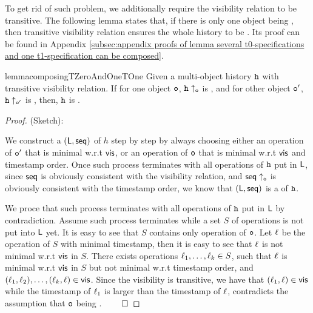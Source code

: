 To get rid of such problem, we additionally require the visibility relation to be transitive. The following lemma states that, if there is only one object being \tonelinearizable{}, then transitive visibility relation ensures the whole history to be \crdtlinearizable{}. Its proof can be found in Appendix \ref{subsec:appendix proofs of lemma several t0-specifications and one t1-specification can be composed}.

\begin{restatable}{lemma}{composingTZeroAndOneTOne}
\label{lemma:several t0-specifications and one t1-specification can be composed}
Given a multi-object history $\mathtt{h}$ with transitive visibility relation. If for one object $\mathtt{o}$, $\mathtt{h} \uparrow_{\mathtt{o}}$ is \tonelinearizable{}, and for other object $\mathtt{o}'$, $\mathtt{h} \uparrow_{\mathtt{o}'}$ is \tzerolinearizable{}, then, $\mathtt{h}$ is \crdtlinearizable{}.
\end{restatable}

\begin {proof} (Sketch):

We construct a \crdtlinearization $(\mathsf{L}, \mathsf{seq})$ of $h$ step by step by always choosing either an operation of $\mathtt{o}'$ that is minimal w.r.t $\mathsf{vis}$, or an operation of $\mathtt{o}$ that is minimal w.r.t $\mathsf{vis}$ and timestamp order. Once such process terminates with all operations of $\mathtt{h}$ put in $\mathsf{L}$, since $\mathsf{seq}$ is obviously consistent with the visibility relation, and $\mathsf{seq} \uparrow_{\mathtt{o}}$ is obviously consistent with the timestamp order, we know that $(\mathsf{L}, \mathsf{seq})$ is a \crdtlinearization of $\mathtt{h}$.

We proce that such process terminates with all operations of $\mathtt{h}$ put in $\mathsf{L}$ by contradiction. Assume such process terminates while a set $S$ of operations is not put into $\mathsf{L}$ yet. It is easy to see that $S$ contains only operation of $\mathtt{o}$. Let $\ell$ be the operation of $S$ with minimal timestamp, then it is easy to see that $\ell$ is not minimal w.r.t $\mathsf{vis}$ in $S$. There exists operations $\ell_1,\ldots,\ell_k \in S$, such that $\ell$ is minimal w.r.t $\mathsf{vis}$ in $S$ but not minimal w.r.t timestamp order, and $(\ell_1,\ell_2),\ldots,(\ell_k,\ell) \in \mathsf{vis}$. Since the visibility is transitive, we have that $(\ell_1,\ell) \in \mathsf{vis}$ while the timestamp of $\ell_1$ is larger than the timestamp of $\ell$, contradicts the assumption that $\mathtt{o}$ being \tonelinearizable{}. $\qed$
\end {proof}


